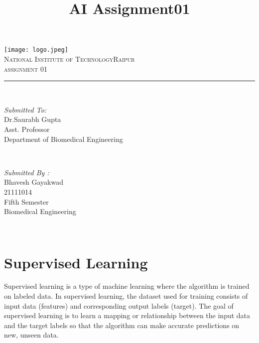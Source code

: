 \documentclass{article}
\title{AI Assignment01}
\begin{document}
\begin{titlepage}
	\centering
    \vspace*{0.5 cm}
    \texttt{[image: logo.jpeg]}\\[1.0 cm]	%
    \textsc{\LARGE  National Institute of Technology\newline\newline Raipur}\\[2.0 cm]	%
	\textsc{\Large assignment 01}\\[0.5 cm]				%
	\rule{\linewidth}{0.2 mm} \\[0.4 cm]

	
	\begin{minipage}{0.4\textwidth}
		\begin{flushleft} \large
			\emph{Submitted To:}\\
			Dr.Saurabh Gupta\\
            Asst. Professor\\
            Department of Biomedical Engineering\\
			\end{flushleft}
			\end{minipage}~
			\begin{minipage}{0.4\textwidth}
            
			\begin{flushright} \large
			\emph{Submitted By :} \\
			Bhavesh Gayakwad\\
            21111014\\
        Fifth Semester\\
        Biomedical Engineering\\
		\end{flushright}
        
	\end{minipage}\\[2 cm]
	

\end{titlepage}

\maketitle

\section{Supervised Learning}
Supervised learning is a type of machine learning where the algorithm is trained on labeled data. In supervised learning, the dataset used for training consists of input data (features) and corresponding output labels (target). The goal of supervised learning is to learn a mapping or relationship between the input data and the target labels so that the algorithm can make accurate predictions on new, unseen data.
\end{document}
